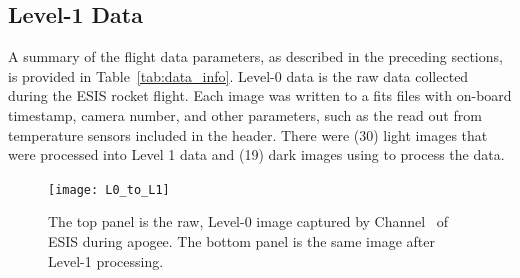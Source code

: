     
    \subsection{Level-1 Data}
	    
  
    
    	A summary of the flight data parameters, as described in the preceding sections, is provided in Table~\ref{tab:data_info}. Level-0 data is the raw data collected during the ESIS rocket flight.  
	    Each image was written to a fits files with on-board timestamp, camera number, and other parameters, such as the read out from temperature sensors included in the header.   There were (30) light images that were processed into Level 1 data and (19) dark images using to process the data.
	   
	    
	    \begin{figure}
	    	\centering
	    	\texttt{[image: L0\_to\_L1]}
	    	\caption{The top panel is the raw, Level-0 image captured by Channel \ of ESIS during apogee. The bottom panel is the same image after Level-1 processing.}
	    	\label{fig:L0_to_L1}
	    \end{figure}
    	
